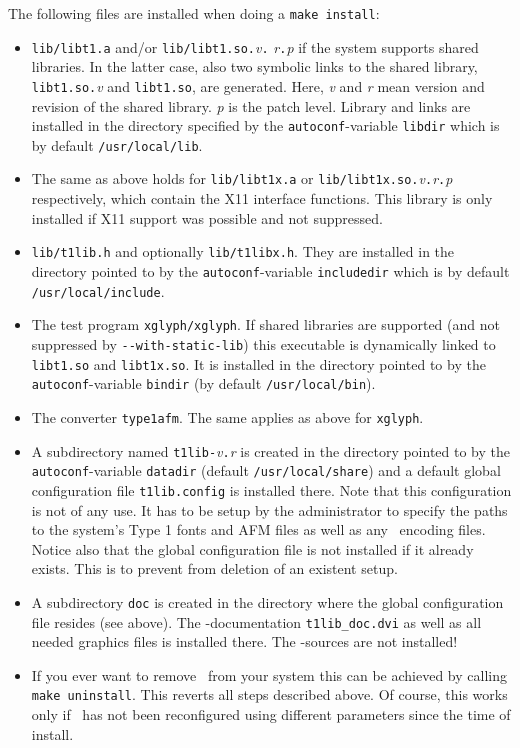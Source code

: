 \begin{enumerate}
  The following files are installed when doing a \verb+make install+:
  \begin{itemize}
  \item \verb+lib/libt1.a+ and/or \verb+lib/libt1.so.+{\em v}\verb+.+{\em
      r}\verb+.+{\em p} if the system supports shared libraries. In
    the latter case, also two symbolic links to the shared library,
    \verb+libt1.so.+{\em v} and \verb+libt1.so+, are generated. Here,
    {\em v} and {\em r} mean version and revision of the shared
    library. {\em p} is the patch level. Library and links are
    installed in the directory 
    specified by the \verb+autoconf+-variable \verb+libdir+ which is by
    default \verb+/usr/local/lib+.
  \item The same as above holds for \verb+lib/libt1x.a+ or
    \verb+lib/libt1x.so.+{\em v}\verb+.+{\em r}\verb+.+{\em p}
    respectively, which contain the X11 interface functions. This
    library is only installed if X11 support was possible and not
    suppressed. 
  \item \verb+lib/t1lib.h+ and optionally \verb+lib/t1libx.h+. They are installed
    in the directory pointed to by the \verb+autoconf+-variable \verb+includedir+
    which is by default\\
    \verb+/usr/local/include+.
  \item The test program \verb+xglyph/xglyph+. If shared libraries are
    supported (and not suppressed by \verb+--with-static-lib+) this
    executable is dynamically linked to \verb+libt1.so+ and
    \verb+libt1x.so+. It is installed in the directory pointed to by
    the \verb+autoconf+-variable \verb+bindir+ (by default
    \verb+/usr/local/bin+).
  \item The converter \verb+type1afm+. The same applies as above for
    \verb+xglyph+.
  \item A subdirectory named \verb+t1lib-+{\em v}\verb+.+{\em r} is created in
    the directory pointed to by the \verb+autoconf+-variable \verb+datadir+ (default
    \verb+/usr/local/share+) and a default global configuration file
    \verb+t1lib.config+ is installed there. Note that this configuration is
    not of any use. It has to be setup by the administrator to specify the
    paths to the system's Type 1 fonts and AFM files as well as any
    \tonelib\ encoding files. Notice also that the global configuration file
    is not installed if it already exists. This is to prevent from deletion of
    an existent setup.
  \item A subdirectory \verb+doc+ is created in the directory where the global
    configuration file resides (see above). The \LaTeXe-documentation
    \verb+t1lib_doc.dvi+ as well as all needed graphics files is installed
    there. The \LaTeXe-sources are not installed!
  \item If you ever want to remove \tonelib\ from your system this can be
    achieved by calling \verb+make uninstall+. This reverts all steps
    described above. Of course, this works only if \tonelib\ has not been
    reconfigured using different parameters since the time of install.
  \end{itemize}
\end{enumerate}

